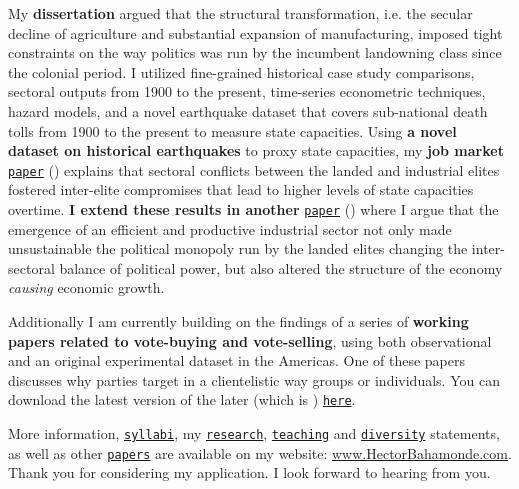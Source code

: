 \documentclass[10pt,stdletter,dateno,sigleft]{newlfm} %
\begin{document}
\begin{newlfm}
My {\bf dissertation} argued that the structural transformation, i.e. the secular decline of agriculture and substantial expansion of manufacturing, imposed tight constraints on the way politics was run by the incumbent landowning class since the colonial period. I utilized fine-grained historical case study comparisons, sectoral outputs from 1900 to the present, time-series econometric techniques, hazard models, and a novel earthquake dataset that covers sub-national death tolls from 1900 to the present to measure state capacities. Using {\bf a novel dataset on historical earthquakes} to proxy state capacities, my {\bf job market} \href{https://github.com/hbahamonde/Earthquake_Paper/raw/master/Bahamonde_Earthquake_Paper.pdf}{\texttt{paper}} (\emph{\unskip}) explains that sectoral conflicts between the landed and industrial elites fostered inter-elite compromises that lead to higher levels of state capacities overtime. {\bf I extend these results in another} \href{https://github.com/hbahamonde/Negative_Link_Paper/raw/master/Bahamonde_NegativeLink.pdf}{\texttt{paper}} (\emph{\unskip}) where I argue that the emergence of an efficient and productive industrial sector not only made unsustainable the political monopoly run by the landed elites changing the inter-sectoral balance of political power, but also altered the structure of the economy \emph{causing} economic growth. 


Additionally I am currently building on the findings of a series of {\bf working papers related to vote-buying and vote-selling}, using both observational and an original experimental dataset in the Americas. One of these papers discusses why parties target in a clientelistic way groups or individuals. You can download the latest version of the later (which is \emph{\unskip}) \href{https://github.com/hbahamonde/Clientelism_paper/raw/master/Bahamonde_Clientelism_Paper.pdf}{\texttt{here}}. 


More information, \href{http://www.hectorbahamonde.com/teaching/}{\texttt{syllabi}}, my \href{http://github.com/hbahamonde/Job_Market/raw/master/Bahamonde_Research_Statement.pdf}{\texttt{research}}, \href{http://github.com/hbahamonde/Job_Market/raw/master/Bahamonde_Teaching_Statement.pdf}{\texttt{teaching}} and \href{http://github.com/hbahamonde/Job_Market/raw/master/Bahamonde_Diversity_Statement.pdf}{\texttt{diversity}} statements, as well as other \href{http://www.hectorbahamonde.com/research/}{\texttt{papers}} are available on my website: \href{http://www.hectorbahamonde.com}{www.HectorBahamonde.com}. Thank you for considering my application. I look forward to hearing from you.






\end{newlfm}
\end{document}
